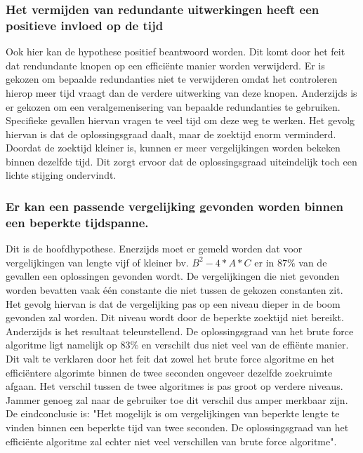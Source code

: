 \documentclass[Main.tex]{subfiles}
\begin{document}
\subsubsection{Het vermijden van redundante uitwerkingen heeft een positieve invloed op de tijd}
Ook hier kan de hypothese positief beantwoord worden. Dit komt door het feit dat rendundante knopen op een effici\"ente manier worden verwijderd. Er is gekozen om bepaalde redundanties niet te verwijderen omdat het controleren hierop meer tijd vraagt dan de verdere uitwerking van deze knopen. Anderzijds is er gekozen om een veralgemenisering van bepaalde redundanties te gebruiken. Specifieke gevallen hiervan vragen te veel tijd om deze weg te werken. Het gevolg hiervan is dat de oplossingsgraad daalt, maar de zoektijd enorm verminderd. Doordat de zoektijd kleiner is, kunnen er meer vergelijkingen worden bekeken binnen dezelfde tijd. Dit zorgt ervoor dat de oplossingsgraad uiteindelijk toch een lichte stijging ondervindt.

\subsubsection{Er kan een passende vergelijking gevonden worden binnen een beperkte tijdspanne.}
Dit is de hoofdhypothese. Enerzijds moet er gemeld worden dat voor vergelijkingen van lengte vijf of kleiner bv. $B^{2} - 4 \ast A \ast C$ er in $87\%$ van de gevallen een oplossingen gevonden wordt. De vergelijkingen die niet gevonden worden bevatten vaak \'e\'en constante die niet tussen de gekozen constanten zit. Het gevolg hiervan is dat de vergelijking pas op een niveau dieper in de boom gevonden zal worden. Dit niveau wordt door de beperkte zoektijd niet bereikt. Anderzijds is het resultaat teleurstellend. De oplossingsgraad van het brute force algoritme ligt namelijk op $83\%$ en verschilt dus niet veel van de effi\"ente manier. Dit valt te verklaren door het feit dat zowel het brute force algoritme en het effici\"entere algorimte binnen de twee seconden ongeveer dezelfde zoekruimte afgaan. Het verschil tussen de twee algoritmes is pas groot op verdere niveaus. Jammer genoeg zal naar de gebruiker toe dit verschil dus amper merkbaar zijn. De eindconclusie is: "Het mogelijk is om vergelijkingen van beperkte lengte te vinden binnen een beperkte tijd van twee seconden. De oplossingsgraad van het effici\"ente algoritme zal echter niet veel verschillen van brute force algoritme".
\end{document}
